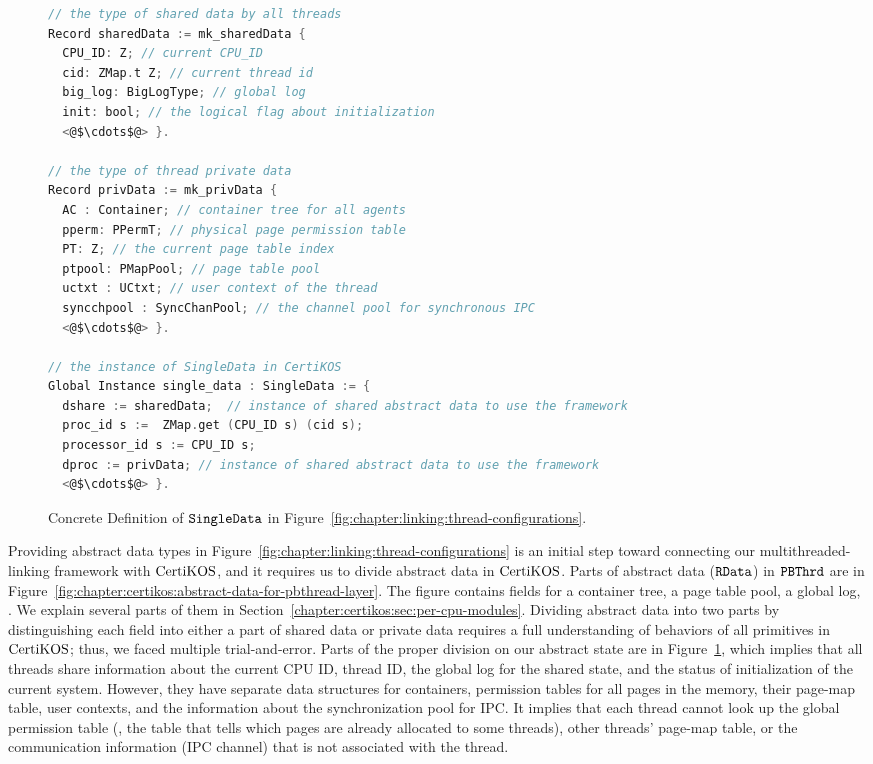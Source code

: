 \begin{figure}
\begin{lstlisting}[language=C]
// the type of shared data by all threads
Record sharedData := mk_sharedData {
  CPU_ID: Z; // current CPU_ID 
  cid: ZMap.t Z; // current thread id
  big_log: BigLogType; // global log
  init: bool; // the logical flag about initialization
  <@$\cdots$@> }.
  
// the type of thread private data
Record privData := mk_privData {
  AC : Container; // container tree for all agents
  pperm: PPermT; // physical page permission table 
  PT: Z; // the current page table index
  ptpool: PMapPool; // page table pool
  uctxt : UCtxt; // user context of the thread
  syncchpool : SyncChanPool; // the channel pool for synchronous IPC
  <@$\cdots$@> }.

// the instance of SingleData in CertiKOS
Global Instance single_data : SingleData := {
  dshare := sharedData;  // instance of shared abstract data to use the framework
  proc_id s :=  ZMap.get (CPU_ID s) (cid s);
  processor_id s := CPU_ID s;
  dproc := privData; // instance of shared abstract data to use the framework
  <@$\cdots$@> }.
\end{lstlisting}
\caption{Concrete Definition of ${\mathrm{\texttt{SingleData}}}$ in Figure~\ref{fig:chapter:linking:thread-configurations}.}

\label{fig:chapter:certikos:single-data-of-multithreaded-linking-certikos}
\end{figure}

Providing abstract data types in  Figure~\ref{fig:chapter:linking:thread-configurations} is an initial step 
toward connecting our multithreaded-linking framework with $\mathrm{CertiKOS}$,
and it requires us to divide abstract data in $\mathrm{CertiKOS}$.
Parts of abstract data (${\mathrm{\texttt{RData}}}$) in ${{\mathrm{\texttt{PBThrd}}}}$
are in Figure~\ref{fig:chapter:certikos:abstract-data-for-pbthread-layer}.
The figure contains fields for a container tree, a page table pool, a global log, \etc.
We explain several parts of them in Section~\ref{chapter:certikos:sec:per-cpu-modules}. 
Dividing  abstract data into two parts by distinguishing 
each field into either a part of shared data or private data
requires a full understanding of  behaviors of all primitives in $\mathrm{CertiKOS}$;
thus, we faced multiple trial-and-error.
Parts of the proper division on our abstract state are in Figure~\ref{fig:chapter:certikos:single-data-of-multithreaded-linking-certikos},
which implies that 
all threads share information about the current CPU ID, thread ID, the global log for the shared state,
and the status of initialization of the current system. 
However, they have separate data structures 
 for containers, permission tables for all pages in the memory, 
 their page-map table, user contexts, and the information about the synchronization pool for IPC.
 It implies that 
 each thread cannot look up the global permission table (\ie, the table that tells which pages are already allocated to some threads),
 other threads' page-map table, or the communication information (IPC channel) that is not associated with the thread.


